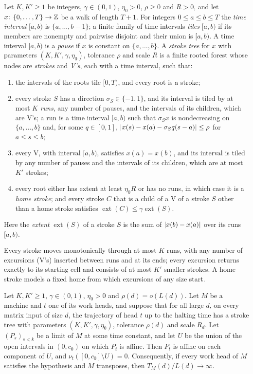 \begin{definition}\label{def:mot-stroke}
Let $K,K'\ge1$ be integers, $\gamma\in(0,1)$, $\eta_0>0$, $\rho\ge0$ and $R>0$, and let $x\colon\{0,\dots,T\}\to\mathbb{Z}$ be a
walk of length $T+1$. For integers $0\le a\le b\le T$ the \emph{time interval} $[a,b)$ is $\{a,\dots,b-1\}$; a finite family of time
intervals \emph{tiles} $[a,b)$ if its members are nonempty and pairwise disjoint and their union is $[a,b)$. A time
interval $[a,b)$ is a \emph{pause} if $x$ is constant on $\{a,\dots,b\}$. A \emph{stroke tree} for $x$ with parameters
$(K,K',\gamma,\eta_0)$, tolerance $\rho$ and scale $R$ is a finite rooted forest whose nodes are \emph{strokes} and
\emph{V's}, each with a time interval, such that:
\begin{enumerate}[label=(\roman*)]
\item the intervals of the roots tile $[0,T)$, and every root is a stroke;
\item every stroke $S$ has a direction $\sigma_S\in\{-1,1\}$, and its interval is tiled by at most $K$ \emph{runs}, any
number of pauses, and the intervals of its children, which are V's; a run is a time interval $[a,b)$ such that
$\sigma_Sx$ is nondecreasing on $\{a,\dots,b\}$ and, for some $q\in[0,1]$, $\lvert x(s)-x(a)-\sigma_Sq(s-a) \rvert\le\rho$ for
$a\le s\le b$;
\item every V, with interval $[a,b)$, satisfies $x(a)=x(b)$, and its interval is tiled by any number of pauses and the
intervals of its children, which are at most $K'$ strokes;
\item every root either has extent at least $\eta_0R$ or has no runs, in which case it is a \emph{home stroke}; and every
stroke $C$ that is a child of a V of a stroke $S$ other than a home stroke satisfies
$\operatorname{ext}(C)\le\gamma\operatorname{ext}(S)$.
\end{enumerate}
Here the \emph{extent} $\operatorname{ext}(S)$ of a stroke $S$ is the sum of $\lvert x(b)-x(a) \rvert$ over its runs $[a,b)$.
\end{definition}

Every stroke moves monotonically through at most $K$ runs, with any number of excursions (V's) inserted between runs and
at its ends; every excursion returns exactly to its starting cell and consists of at most $K'$ smaller strokes. A home
stroke models a fixed home from which excursions of any size start.

\begin{proposition}\label{prop:mot-strokes}
\notformalized
Let $K,K'\ge1$, $\gamma\in(0,1)$, $\eta_0>0$ and $\rho(d)=o(L(d))$. Let $M$ be a machine and $t$ one of its work heads,
and suppose that for all large $d$, on every matrix input of size $d$, the trajectory of head $t$ up to the halting time
has a stroke tree with parameters $(K,K',\gamma,\eta_0)$, tolerance $\rho(d)$ and scale $R_d$. Let $(P_s)_{s<k}$ be a
limit of $M$ at some time constant, and let $U$ be the union of the open intervals in $(0,c_0)$ on which $P_t$ is affine.
Then $P_t$ is affine on each component of $U$, and $\nu_t([0,c_0]\setminus U)=0$. Consequently, if every work head of
$M$ satisfies the hypothesis and $M$ transposes, then $T_M(d)/L(d)\to\infty$.
\end{proposition}

